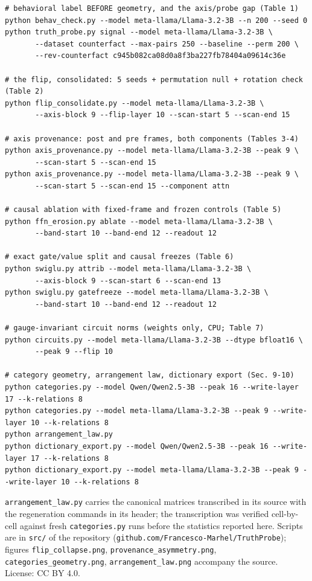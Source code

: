 \documentclass[11pt]{article}
\begin{document}
\begin{verbatim}
# behavioral label BEFORE geometry, and the axis/probe gap (Table 1)
python behav_check.py --model meta-llama/Llama-3.2-3B --n 200 --seed 0
python truth_probe.py signal --model meta-llama/Llama-3.2-3B \
       --dataset counterfact --max-pairs 250 --baseline --perm 200 \
       --rev-counterfact c945b082ca08d0a8f3ba227fb78404a09614c36e

# the flip, consolidated: 5 seeds + permutation null + rotation check (Table 2)
python flip_consolidate.py --model meta-llama/Llama-3.2-3B \
       --axis-block 9 --flip-layer 10 --scan-start 5 --scan-end 15

# axis provenance: post and pre frames, both components (Tables 3-4)
python axis_provenance.py --model meta-llama/Llama-3.2-3B --peak 9 \
       --scan-start 5 --scan-end 15
python axis_provenance.py --model meta-llama/Llama-3.2-3B --peak 9 \
       --scan-start 5 --scan-end 15 --component attn

# causal ablation with fixed-frame and frozen controls (Table 5)
python ffn_erosion.py ablate --model meta-llama/Llama-3.2-3B \
       --band-start 10 --band-end 12 --readout 12

# exact gate/value split and causal freezes (Table 6)
python swiglu.py attrib --model meta-llama/Llama-3.2-3B \
       --axis-block 9 --scan-start 6 --scan-end 13
python swiglu.py gatefreeze --model meta-llama/Llama-3.2-3B \
       --band-start 10 --band-end 12 --readout 12

# gauge-invariant circuit norms (weights only, CPU; Table 7)
python circuits.py --model meta-llama/Llama-3.2-3B --dtype bfloat16 \
       --peak 9 --flip 10

# category geometry, arrangement law, dictionary export (Sec. 9-10)
python categories.py --model Qwen/Qwen2.5-3B --peak 16 --write-layer 17 --k-relations 8
python categories.py --model meta-llama/Llama-3.2-3B --peak 9 --write-layer 10 --k-relations 8
python arrangement_law.py
python dictionary_export.py --model Qwen/Qwen2.5-3B --peak 16 --write-layer 17 --k-relations 8
python dictionary_export.py --model meta-llama/Llama-3.2-3B --peak 9 --write-layer 10 --k-relations 8
\end{verbatim}

\texttt{arrangement\_law.py} carries the canonical matrices transcribed in
its source with the regeneration commands in its header; the transcription
was verified cell-by-cell against fresh \texttt{categories.py} runs before
the statistics reported here. Scripts are in \texttt{src/} of the
repository (\texttt{github.com/Francesco-Marhel/TruthProbe}); figures
\texttt{flip\_collapse.png}, \texttt{provenance\_asymmetry.png},
\texttt{categories\_geometry.png}, \texttt{arrangement\_law.png} accompany
the source. License: CC BY 4.0.
\end{document}
